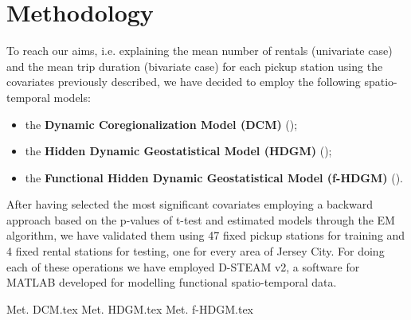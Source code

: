 \section{Methodology}
To reach our aims, i.e. explaining the mean number of rentals (univariate case) and the mean trip duration (bivariate case) for each pickup station using the covariates previously described, we have decided to employ the following spatio-temporal models:
\begin{itemize}
	\item the \textbf{Dynamic Coregionalization Model (DCM)} (\cite{dcm});
	\item the \textbf{Hidden Dynamic Geostatistical Model (HDGM)} (\cite{hdgm});
	\item the \textbf{Functional Hidden Dynamic Geostatistical Model (f-HDGM)} (\cite{dstem}).
\end{itemize}
After having selected the most significant covariates employing a backward approach based on the p-values of t-test and estimated models through the EM algorithm, we have validated them using \num{47} fixed pickup stations for training and \num{4} fixed rental stations for testing, one for every area of Jersey City. For doing each of these operations we have employed D-STEAM v\num{2}, a software for MATLAB developed for modelling functional spatio-temporal data.

{Met. DCM.tex}
{Met. HDGM.tex}
{Met. f-HDGM.tex}